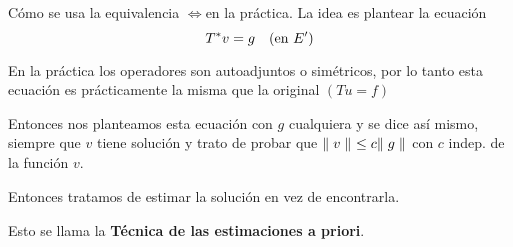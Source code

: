 \begin{note}
Cómo se usa la equivalencia \iitem[i]$\iff$\iitem[ii] en la práctica. La idea es plantear la ecuación $$
T\adj v = g \quad \text{(en $E'$)}
$$

En la práctica los operadores son autoadjuntos o simétricos, por lo tanto esta ecuación es prácticamente la misma que la original $(T u = f)$

Entonces nos planteamos esta ecuación con $g$ cualquiera y se dice así mismo, siempre que $v$ tiene solución y trato de probar que $\norm[]{v} \leq c \norm[]{g}$ con $c$ indep. de la función $v$. 

Entonces tratamos de estimar la solución en vez de encontrarla.

Esto se llama la \textbf{Técnica de las estimaciones a priori}.
\end{note}